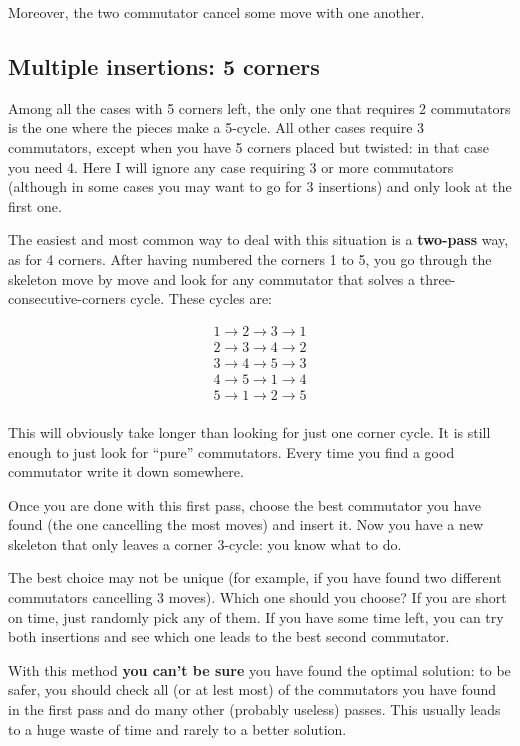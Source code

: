 \documentclass[11pt,a4paper]{book}
\begin{document}
Moreover, the two commutator cancel some move with one another.

\subsection{Multiple insertions: 5 corners}

Among all the cases with 5 corners left, the only one that requires 2 commutators is the one where the pieces make a 5-cycle. All other cases require 3 commutators, except when you have 5 corners placed but twisted: in that case you need 4. Here I will ignore any case requiring 3 or more commutators (although in some cases you may want to go for 3 insertions) and only look at the first one.

The easiest and most common way to deal with this situation is a \textbf{two-pass} way, as for 4 corners. After having numbered the corners 1 to 5, you go through the skeleton move by move and look for any commutator that solves a three-consecutive-corners cycle. These cycles are:

\begin{align*}
1 \to 2 \to 3 \to 1\\
2 \to 3 \to 4 \to 2\\
3 \to 4 \to 5 \to 3\\
4 \to 5 \to 1 \to 4\\
5 \to 1 \to 2 \to 5\\
\end{align*}

This will obviously take longer than looking for just one corner cycle. It is still enough to just look for ``pure'' commutators. Every time you find a good commutator write it down somewhere.

Once you are done with this first pass, choose the best commutator you have found (the one cancelling the most moves) and insert it. Now you have a new skeleton that only leaves a corner 3-cycle: you know what to do.

The best choice may not be unique (for example, if you have found two different commutators cancelling 3 moves). Which one should you choose? If you are short on time, just randomly pick any of them. If you have some time left, you can try both insertions and see which one leads to the best second commutator.

With this method \textbf{you can't be sure} you have found the optimal solution: to be safer, you should check all (or at lest most) of the commutators you have found in the first pass and do many other (probably useless) passes. This usually leads to a huge waste of time and rarely to a better solution.
\end{document}
